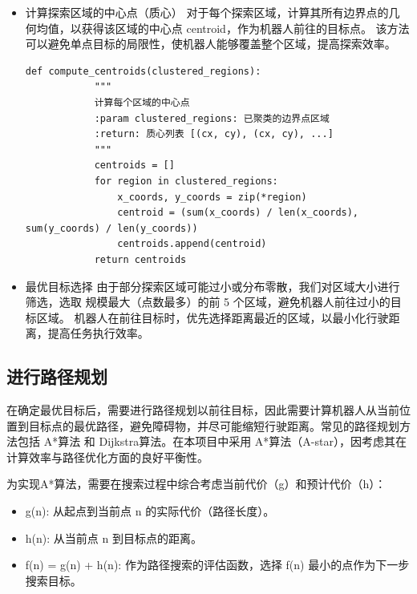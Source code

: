 \begin{itemize}
    \item 计算探索区域的中心点（质心）
        对于每个探索区域，计算其所有边界点的几何均值，以获得该区域的中心点 centroid，作为机器人前往的目标点。
        该方法可以避免单点目标的局限性，使机器人能够覆盖整个区域，提高探索效率。
        \begin{lstlisting}[caption={计算每个区域的中心点}]
        def compute_centroids(clustered_regions):
            """
            计算每个区域的中心点
            :param clustered_regions: 已聚类的边界点区域
            :return: 质心列表 [(cx, cy), (cx, cy), ...]
            """
            centroids = []
            for region in clustered_regions:
                x_coords, y_coords = zip(*region)
                centroid = (sum(x_coords) / len(x_coords), sum(y_coords) / len(y_coords))
                centroids.append(centroid)
            return centroids
        \end{lstlisting}
    \item 最优目标选择
        由于部分探索区域可能过小或分布零散，我们对区域大小进行筛选，选取 规模最大（点数最多）的前 5 个区域，避免机器人前往过小的目标区域。
        机器人在前往目标时，优先选择距离最近的区域，以最小化行驶距离，提高任务执行效率。
        
\end{itemize}
\subsection{进行路径规划}
在确定最优目标后，需要进行路径规划以前往目标，因此需要计算机器人从当前位置到目标点的最优路径，避免障碍物，并尽可能缩短行驶距离。常见的路径规划方法包括 A*算法 和 Dijkstra算法。在本项目中采用 A*算法（A-star），因考虑其在计算效率与路径优化方面的良好平衡性。

为实现A*算法，需要在搜索过程中综合考虑当前代价（g）和预计代价（h）：
\begin{itemize}
    \item g(n): 从起点到当前点 n 的实际代价（路径长度）。
    \item h(n): 从当前点 n 到目标点的距离。
    \item f(n) = g(n) + h(n): 作为路径搜索的评估函数，选择 f(n) 最小的点作为下一步搜索目标。
\end{itemize}

